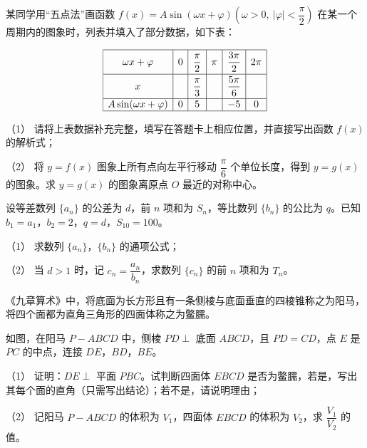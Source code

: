 \begin{question}
某同学用“五点法”画函数 \(f(x)=A\sin(\omega x+\varphi)\left(\omega>0,\ |\varphi|<\dfrac{\pi}{2}\right)\) 在某一个周期内的图象时，列表并填入了部分数据，如下表：

\nopagebreak[4]
\[
\begin{array}{|c|c|c|c|c|c|}
\hline
\rule{0pt}{1.5em}\omega x+\varphi & 0 & \dfrac{\pi}{2} & \pi & \dfrac{3\pi}{2} & 2\pi\\[0.55em]
\hline
\rule{0pt}{1.5em}x & & \dfrac{\pi}{3} & & \dfrac{5\pi}{6} & \\[0.55em]
\hline
A\sin(\omega x+\varphi) & 0 & 5 & & -5 & 0\\
\hline
\end{array}
\]

（1） 请将上表数据补充完整，填写在答题卡上相应位置，并直接写出函数 \(f(x)\) 的解析式；

（2） 将 \(y=f(x)\) 图象上所有点向左平行移动 \(\dfrac{\pi}{6}\) 个单位长度，得到 \(y=g(x)\) 的图象。求 \(y=g(x)\) 的图象离原点 \(O\) 最近的对称中心。

\end{question}
\begin{question}
设等差数列 \(\{a_n\}\) 的公差为 \(d\)，前 \(n\) 项和为 \(S_n\)，等比数列 \(\{b_n\}\) 的公比为 \(q\)。已知 \(b_1=a_1\)，\(b_2=2\)，\(q=d\)，\(S_{10}=100\)。

（1） 求数列 \(\{a_n\}\)，\(\{b_n\}\) 的通项公式；

（2） 当 \(d>1\) 时，记 \(c_n=\dfrac{a_n}{b_n}\)，求数列 \(\{c_n\}\) 的前 \(n\) 项和为 \(T_n\)。

\Needspace{0.4\textheight}
\end{question}
\begin{question}
《九章算术》中，将底面为长方形且有一条侧棱与底面垂直的四棱锥称之为阳马，将四个面都为直角三角形的四面体称之为鳖臑。

如图，在阳马 \(P-ABCD\) 中，侧棱 \(PD\perp\) 底面 \(ABCD\)，且 \(PD=CD\)，点 \(E\) 是 \(PC\) 的中点，连接 \(DE\)，\(BD\)，\(BE\)。

（1） 证明：\(DE\perp\) 平面 \(PBC\)。试判断四面体 \(EBCD\) 是否为鳖臑，若是，写出其每个面的直角（只需写出结论）；若不是，请说明理由；

（2） 记阳马 \(P-ABCD\) 的体积为 \(V_1\)，四面体 \(EBCD\) 的体积为 \(V_2\)，求 \(\dfrac{V_1}{V_2}\) 的值。
\nopagebreak[4]
\begin{center}\end{center}
\nopagebreak[4]
\end{question}
